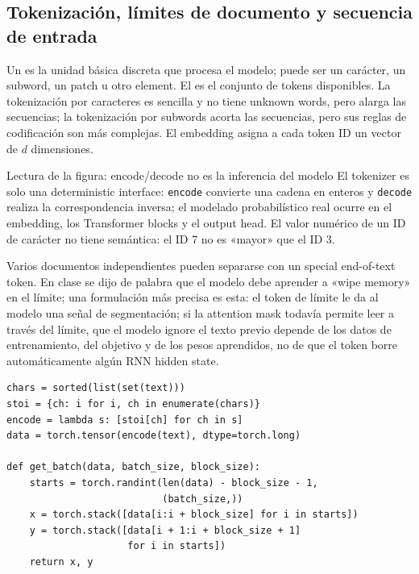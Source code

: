 \subsection{Tokenización, límites de documento y secuencia de entrada}

Un  es la unidad básica discreta que procesa el modelo; puede ser un carácter, un subword, un patch u otro element. El  es el conjunto de tokens disponibles. La tokenización por caracteres es sencilla y no tiene unknown words, pero alarga las secuencias; la tokenización por subwords acorta las secuencias, pero sus reglas de codificación son más complejas. El embedding asigna a cada token ID un vector de $d$ dimensiones.


\begin{knowledgebox}{Lectura de la figura: encode/decode no es la inferencia del modelo}
El tokenizer es solo una deterministic interface: \texttt{encode} convierte una cadena en enteros y \texttt{decode} realiza la correspondencia inversa; el modelado probabilístico real ocurre en el embedding, los Transformer blocks y el output head. El valor numérico de un ID de carácter no tiene semántica: el ID 7 no es «mayor» que el ID 3.
\end{knowledgebox}


Varios documentos independientes pueden separarse con un special end-of-text token. En clase se dijo de palabra que el modelo debe aprender a «wipe memory» en el límite; una formulación más precisa es esta: el token de límite le da al modelo una señal de segmentación; si la attention mask todavía permite leer a través del límite, que el modelo ignore el texto previo depende de los datos de entrenamiento, del objetivo y de los pesos aprendidos, no de que el token borre automáticamente algún RNN hidden state.

\begin{lstlisting}[caption={Codificación de caracteres de Tiny Shakespeare y construcción del shifted batch.}]
chars = sorted(list(set(text)))
stoi = {ch: i for i, ch in enumerate(chars)}
encode = lambda s: [stoi[ch] for ch in s]
data = torch.tensor(encode(text), dtype=torch.long)

def get_batch(data, batch_size, block_size):
    starts = torch.randint(len(data) - block_size - 1,
                           (batch_size,))
    x = torch.stack([data[i:i + block_size] for i in starts])
    y = torch.stack([data[i + 1:i + block_size + 1]
                     for i in starts])
    return x, y
\end{lstlisting}

